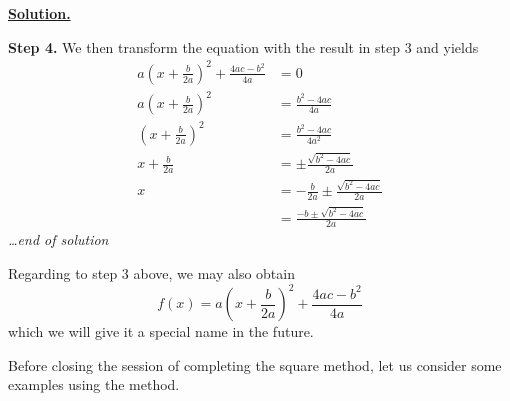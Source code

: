 \documentclass[12pt]{article}
\newenvironment{solution}{\begin{snugshade*} \underline{\textbf{Solution.}} \par}{\hfill \textit{\dots end of solution} \end{snugshade*}}
\begin{document}
\begin{solution}
        \textbf{Step 4.} We then transform the equation with the result in step 3 and yields \begin{align*}
            a(x+\frac{b}{2a})^2+\frac{4ac-b^2}{4a}&=0\\
            a(x+\frac{b}{2a})^2&=\frac{b^2-4ac}{4a}\\
            (x+\frac{b}{2a})^2&=\frac{b^2-4ac}{4a^2}\\
            x+\frac{b}{2a}&=\pm\frac{\sqrt{b^2-4ac}}{2a}\\
            x&=-\frac{b}{2a}\pm\frac{\sqrt{b^2-4ac}}{2a}\\
            &=\frac{-b\pm \sqrt{b^2-4ac}}{2a}
        \end{align*}
    \end{solution}

    Regarding to step 3 above, we may also obtain \[f(x)=a(x+\frac{b}{2a})^2+\frac{4ac-b^2}{4a}\] which we will give it a special name in the future.

    Before closing the session of completing the square method, let us consider some examples using the method.
\end{document}
